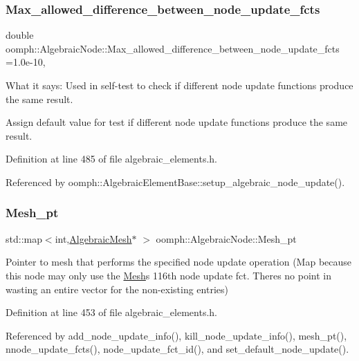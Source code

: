 \subsubsection{\texorpdfstring{Max\+\_\+allowed\+\_\+difference\+\_\+between\+\_\+node\+\_\+update\+\_\+fcts}{Max\_allowed\_difference\_between\_node\_update\_fcts}}
{\footnotesize\ttfamily double oomph\+::\+Algebraic\+Node\+::\+Max\+\_\+allowed\+\_\+difference\+\_\+between\+\_\+node\+\_\+update\+\_\+fcts =1.\+0e-\/10\hspace{0.3cm}{\ttfamily [static]}, {\ttfamily [private]}}

What it says\+: Used in self-\/test to check if different node update functions produce the same result.

Assign default value for test if different node update functions produce the same result. 

Definition at line 485 of file algebraic\+\_\+elements.\+h.



Referenced by oomph\+::\+Algebraic\+Element\+Base\+::setup\+\_\+algebraic\+\_\+node\+\_\+update().

\mbox{\label{classoomph_1_1AlgebraicNode_af60d3301f8ffd16bcd3ee32809beebd8}} 
\subsubsection{\texorpdfstring{Mesh\+\_\+pt}{Mesh\_pt}}
{\footnotesize\ttfamily std\+::map$<$int,\hyperlink{classoomph_1_1AlgebraicMesh}{Algebraic\+Mesh}$\ast$ $>$ oomph\+::\+Algebraic\+Node\+::\+Mesh\+\_\+pt\hspace{0.3cm}{\ttfamily [private]}}



Pointer to mesh that performs the specified node update operation (Map because this node may only use the \hyperlink{classoomph_1_1Mesh}{Mesh}\textquotesingle{}s 116th node update fct. There\textquotesingle{}s no point in wasting an entire vector for the non-\/existing entries) 



Definition at line 453 of file algebraic\+\_\+elements.\+h.



Referenced by add\+\_\+node\+\_\+update\+\_\+info(), kill\+\_\+node\+\_\+update\+\_\+info(), mesh\+\_\+pt(), nnode\+\_\+update\+\_\+fcts(), node\+\_\+update\+\_\+fct\+\_\+id(), and set\+\_\+default\+\_\+node\+\_\+update().

